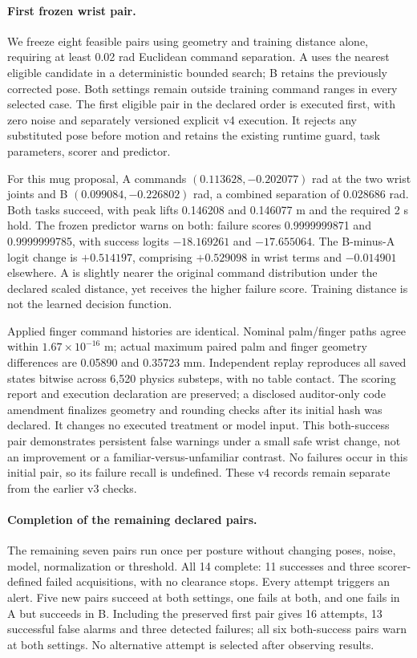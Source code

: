 \documentclass[10pt,letterpaper]{article}
\begin{document}
\paragraph{First frozen wrist pair.}
We freeze eight feasible pairs using geometry and training distance alone,
requiring at least 0.02 rad Euclidean command separation. A uses the nearest
eligible candidate in a deterministic bounded search; B retains the previously
corrected pose. Both settings remain outside training command ranges in every
selected case. The first eligible pair in the declared order is executed first,
with zero noise and separately versioned explicit v4 execution. It rejects
any substituted pose before motion and retains the existing runtime guard,
task parameters, scorer and predictor.

For this mug proposal, A commands $(0.113628,-0.202077)$ rad at the two wrist
joints and B $(0.099084,-0.226802)$ rad, a combined separation of 0.028686 rad.
Both tasks succeed, with peak lifts 0.146208 and 0.146077 m and the required
2 s hold. The frozen predictor warns on both: failure scores
0.9999999871 and 0.9999999785, with success logits $-18.169261$ and $-17.655064$.
The B-minus-A logit change is $+0.514197$, comprising $+0.529098$ in wrist terms
and $-0.014901$ elsewhere. A is slightly nearer the original command
distribution under the declared scaled distance, yet receives the higher
failure score. Training distance is not the learned decision function.

Applied finger command histories are identical. Nominal palm/finger paths
agree within $1.67\times10^{-16}$ m; actual maximum paired palm and finger
geometry differences are 0.05890 and 0.35723 mm. Independent replay reproduces
all saved states bitwise across 6,520 physics substeps, with no table contact.
The scoring report and execution declaration are preserved; a disclosed
auditor-only code amendment finalizes geometry and rounding checks after its
initial hash was declared. It changes no executed treatment or model input.
This both-success pair demonstrates persistent false warnings under a small
safe wrist change, not an improvement or a familiar-versus-unfamiliar contrast.
No failures occur in this initial pair, so its failure recall is undefined.
These v4 records remain separate from the earlier v3 checks.

\paragraph{Completion of the remaining declared pairs.}
The remaining seven pairs run once per posture without changing poses, noise,
model, normalization or threshold. All 14 complete: 11 successes and three
scorer-defined failed acquisitions, with no clearance stops. Every attempt
triggers an alert. Five new pairs succeed at both settings, one fails at both,
and one fails in A but succeeds in B. Including the preserved first pair gives
16 attempts, 13 successful false alarms and three detected failures; all six
both-success pairs warn at both settings. No alternative attempt is selected
after observing results.
\end{document}
